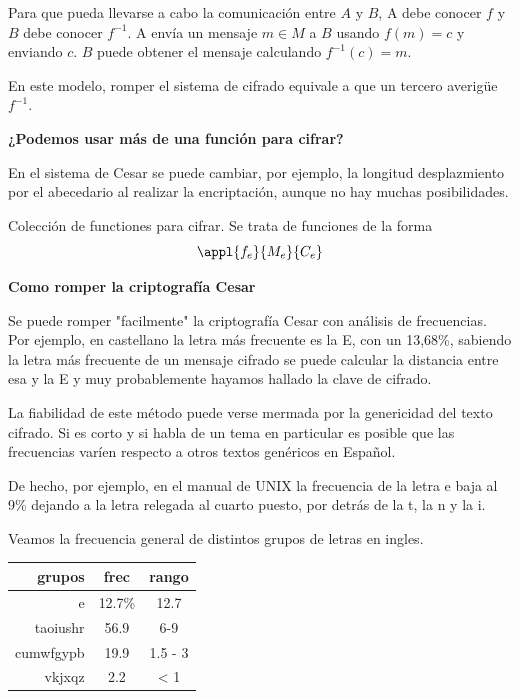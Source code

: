 		Para que pueda llevarse a cabo la comunicación entre $A$ y $B$, A debe conocer $f$ y $B$ debe conocer $f^{-1}$. A envía un mensaje $m\in M$ a $B$ usando $f(m)=c$ y enviando $c$. $B$ puede obtener el mensaje calculando $f^{-1}(c) = m$.

		En este modelo, romper el sistema de cifrado equivale a que un tercero averigüe $f^{-1}$.


		\textbf{¿Podemos usar más de una función para cifrar?}

		En el sistema de Cesar se puede cambiar, por ejemplo, la longitud desplazmiento por el abecedario al realizar la encriptación, aunque no hay muchas posibilidades.

		\begin{defn}[Criptosistema]
			Colección de functiones para cifrar. Se trata de funciones de la forma
			\[\appl{f_e}{M_e}{C_e}\]
		\end{defn}


		\begin{example}{\textbf{Como romper la criptografía Cesar}}

			Se puede romper "facilmente" la criptografía Cesar con análisis de frecuencias. Por ejemplo, en castellano la letra más frecuente es la E, con un 13,68\%, sabiendo la letra más frecuente de un mensaje cifrado se puede calcular la distancia entre esa y la E y muy probablemente hayamos hallado la clave de cifrado.

			La fiabilidad de este método puede verse mermada por la genericidad del texto cifrado. Si es corto y si habla de un tema en particular es posible que las frecuencias varíen respecto a otros textos genéricos en Español.

			De hecho, por ejemplo, en el manual de UNIX la frecuencia de la letra e baja al 9\% dejando a la letra relegada al cuarto puesto, por detrás de la t, la n y la i.

		\end{example}


		Veamos la frecuencia general de distintos grupos de letras en ingles.

		\begin{tabular}[h]{r|c|c}
			\textbf{grupos} & \textbf{frec} & \textbf{rango} \\ \hline
			e & 12.7\% & 12.7 \\
			taoiushr & 56.9 & 6-9 \\
			cumwfgypb & 19.9 & 1.5 - 3 \\
			vkjxqz & 2.2 & < 1
		\end{tabular}

